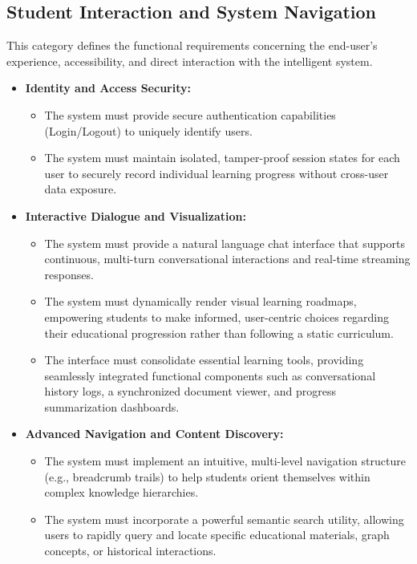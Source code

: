\subsection{Student Interaction and System Navigation}
This category defines the functional requirements concerning the end-user's experience, accessibility, and direct interaction with the intelligent system.

\begin{itemize}
    \item \textbf{Identity and Access Security:}
    \begin{itemize}
        \item The system must provide secure authentication capabilities (Login/Logout) to uniquely identify users.
        \item The system must maintain isolated, tamper-proof session states for each user to securely record individual learning progress without cross-user data exposure.
    \end{itemize}
    
    \item \textbf{Interactive Dialogue and Visualization:}
    \begin{itemize}
        \item The system must provide a natural language chat interface that supports continuous, multi-turn conversational interactions and real-time streaming responses.
        \item The system must dynamically render visual learning roadmaps, empowering students to make informed, user-centric choices regarding their educational progression rather than following a static curriculum.
        \item The interface must consolidate essential learning tools, providing seamlessly integrated functional components such as conversational history logs, a synchronized document viewer, and progress summarization dashboards.
    \end{itemize}
    
    \item \textbf{Advanced Navigation and Content Discovery:}
    \begin{itemize}
        \item The system must implement an intuitive, multi-level navigation structure (e.g., breadcrumb trails) to help students orient themselves within complex knowledge hierarchies.
        \item The system must incorporate a powerful semantic search utility, allowing users to rapidly query and locate specific educational materials, graph concepts, or historical interactions.
    \end{itemize}
    

\end{itemize}
